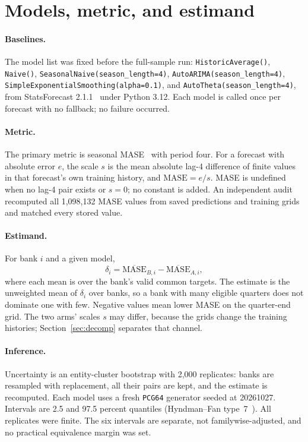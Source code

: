 \documentclass[11pt]{article}
\begin{document}
\section{Models, metric, and estimand}\label{sec:estimand}
\begin{sloppypar}
\paragraph{Baselines.} The model list was fixed before the full-sample run: \texttt{HistoricAverage()}, \texttt{Naive()}, \texttt{SeasonalNaive(season\_length=4)}, \texttt{AutoARIMA(season\_length=4)}, \texttt{SimpleExponentialSmoothing(alpha=0.1)}, and \texttt{AutoTheta(season\_length=4)}, from StatsForecast 2.1.1~\cite{statsforecast} under Python 3.12. Each model is called once per forecast with no fallback; no failure occurred.
\end{sloppypar}

\paragraph{Metric.} The primary metric is seasonal MASE~\cite{hyndman2006} with period four. For a forecast with absolute error $e$, the scale $s$ is the mean absolute lag-4 difference of finite values in that forecast's own training history, and $\mathrm{MASE}=e/s$. MASE is undefined when no lag-4 pair exists or $s=0$; no constant is added. An independent audit recomputed all 1,098,132 MASE values from saved predictions and training grids and matched every stored value.

\paragraph{Estimand.} For bank $i$ and a given model,
\begin{equation}\label{eq:delta}
  \delta_i = \overline{\mathrm{MASE}}_{B,i} - \overline{\mathrm{MASE}}_{A,i},
\end{equation}
where each mean is over the bank's valid common targets. The estimate is the unweighted mean of $\delta_i$ over banks, so a bank with many eligible quarters does not dominate one with few. Negative values mean lower MASE on the quarter-end grid. The two arms' scales $s$ may differ, because the grids change the training histories; Section~\ref{sec:decomp} separates that channel.

\paragraph{Inference.} Uncertainty is an entity-cluster bootstrap with 2,000 replicates: banks are resampled with replacement, all their pairs are kept, and the estimate is recomputed. Each model uses a fresh \texttt{PCG64} generator seeded at 20261027. Intervals are 2.5 and 97.5 percent quantiles (Hyndman--Fan type~7~\cite{hyndman1996}). All replicates were finite. The six intervals are separate, not familywise-adjusted, and no practical equivalence margin was set.
\end{document}

